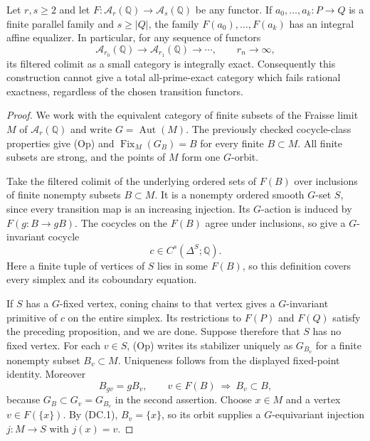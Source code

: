 \begin{theorem}
\label{C4:degree-colimit-exclusion}
Let $r,s\geq2$ and let
$F:\mathcal A_r(\mathbb Q)\to\mathcal A_s(\mathbb Q)$ be any
functor. If $a_0,\ldots,a_k:P\to Q$ is a finite parallel family
and $s\geq |Q|$, the family $F(a_0),\ldots,F(a_k)$ has an integral
affine equalizer. In particular, for any sequence of functors
\[
 \mathcal A_{r_0}(\mathbb Q)\longrightarrow
 \mathcal A_{r_1}(\mathbb Q)\longrightarrow\cdots,
 \qquad r_n\longrightarrow\infty,
\]
its filtered colimit as a small category is integrally exact.
Consequently this construction cannot give a total all-prime-exact
category which fails rational exactness, regardless of the chosen
transition functors.
\end{theorem}
\begin{proof}
We work with the equivalent category of finite subsets of the
Fraisse limit $M$ of $\mathcal A_r(\mathbb Q)$ and write
$G=\operatorname{Aut}(M)$. The previously checked cocycle-class
properties give (Op) and
$\operatorname{Fix}_M(G_B)=B$ for every finite $B\subset M$.
All finite subsets are strong, and the points of $M$ form one
$G$-orbit.

Take the filtered colimit of the underlying ordered sets of $F(B)$
over inclusions of finite nonempty subsets $B\subset M$. It is a
nonempty ordered smooth $G$-set $S$, since every transition map is
an increasing injection. Its $G$-action is induced by
$F(g:B\to gB)$. The cocycles on the $F(B)$ agree under inclusions,
so give a $G$-invariant cocycle
\[
 c\in C^s(\Delta^S;\mathbb Q).
\]
Here a finite tuple of vertices of $S$ lies in some $F(B)$, so this
definition covers every simplex and its coboundary equation.

If $S$ has a $G$-fixed vertex, coning chains to that vertex gives
a $G$-invariant primitive of $c$ on the entire simplex. Its
restrictions to $F(P)$ and $F(Q)$ satisfy the preceding proposition,
and we are done. Suppose therefore that $S$ has no fixed vertex.
For each $v\in S$, (Op) writes its stabilizer uniquely as
$G_{B_v}$ for a finite nonempty subset $B_v\subset M$. Uniqueness
follows from the displayed fixed-point identity. Moreover
\[
 B_{gv}=gB_v,
 \qquad v\in F(B)\ \Longrightarrow\ B_v\subset B,
 \tag{DC.1}
\]
because $G_B\subset G_v=G_{B_v}$ in the second assertion.
Choose $x\in M$ and a vertex $v\in F(\{x\})$. By (DC.1),
$B_v=\{x\}$, so its orbit supplies a $G$-equivariant injection
$j:M\to S$ with $j(x)=v$.


\end{proof}
